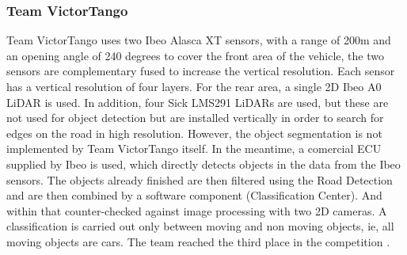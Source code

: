 \documentclass[11pt,oneside,openright]{mpreport}
\begin{document}
\subsubsection{Team VictorTango}

Team VictorTango \cite{Atreya2007} uses two Ibeo Alasca XT sensors, with a range of 200m and an opening angle of 240 degrees to cover the front area of ​​the vehicle, 
the two sensors are complementary fused to increase the vertical resolution. Each sensor has a vertical resolution of four layers. For the rear area, a single 2D Ibeo A0 LiDAR is used. 
In addition, four Sick LMS291 LiDARs are used, but these are not used for object detection but are installed vertically in order to search for edges on the road in high resolution.
However, the object segmentation is not implemented by Team VictorTango itself. In the meantime, a comercial ECU supplied by Ibeo is used, which directly detects objects in the data from the Ibeo sensors.
The objects already finished are then filtered using the Road Detection and are then combined by a software component (Classification Center). And within that counter-checked against image processing
with two 2D cameras. A classification is carried out only between moving and non moving objects, ie, all moving objects are cars. The team reached the third place in the competition \cite{Release2007}.
\end{document}
